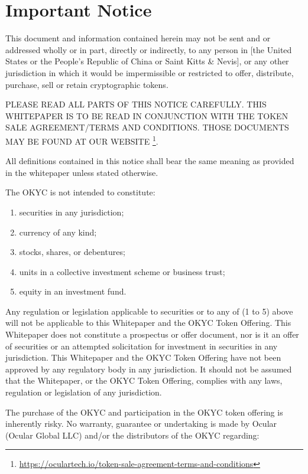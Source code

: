 \documentclass[a4paper]{article}
\begin{document}
\pagebreak

\tableofcontents

\pagebreak

\section{Important Notice}
This document and information contained herein may not be sent and or addressed wholly or in part, directly or indirectly, to any person in [the United States or the People’s Republic of China or Saint Kitts \& Nevis], or any other jurisdiction in which it would be impermissible or restricted to offer, distribute, purchase, sell or retain cryptographic tokens.

PLEASE READ ALL PARTS OF THIS NOTICE CAREFULLY. THIS WHITEPAPER IS TO BE READ IN CONJUNCTION WITH THE TOKEN SALE AGREEMENT/TERMS AND CONDITIONS. THOSE DOCUMENTS MAY BE FOUND AT OUR WEBSITE \footnote{\url{https://oculartech.io/token-sale-agreement-terms-and-conditions}}.

All definitions contained in this notice shall bear the same meaning as provided in the whitepaper unless stated otherwise.

The OKYC is not intended to constitute:
\begin{enumerate}
\item securities in any jurisdiction;
\item currency of any kind;
\item stocks, shares, or debentures;
\item units in a collective investment scheme or business trust;
\item equity in an investment fund.
\end{enumerate}

Any regulation or legislation applicable to securities or to any of (1 to 5) above will not be applicable to this Whitepaper and the OKYC Token Offering. This Whitepaper does not constitute a prospectus or offer document, nor is it an offer of securities or an attempted solicitation for investment in securities in any jurisdiction. This Whitepaper and the OKYC Token Offering have not been approved by any regulatory body in any jurisdiction. It should not be assumed that the Whitepaper, or the OKYC Token Offering, complies with any laws, regulation or legislation of any jurisdiction.

The purchase of the OKYC and participation in the OKYC token offering is inherently risky. No warranty, guarantee or undertaking is made by Ocular (Ocular Global LLC) and/or the distributors of the OKYC regarding:
\end{document}
